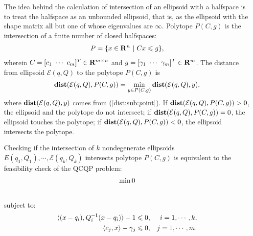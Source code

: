 \documentclass[letterpaper,10pt,english]{sphinxmanual}
\begin{document}
The idea behind the calculation of intersection of an ellipsoid with a
halfspace is to treat the halfspace as an unbounded ellipsoid, that is,
as the ellipsoid with the shape matrix all but one of whose eigenvalues
are $\infty$.
Polytope $P(C,g)$ is the
intersection of a finite number of closed halfspaces:
\label{chap_ellcalc:equation-polytope}\begin{gather}
\begin{split}P = \{x\in{\bf R}^n ~|~ Cx\leqslant g\},\end{split}\label{chap_ellcalc-polytope}
\end{gather}
wherein $C=[c_1 ~ \cdots ~ c_m]^T\in{\bf R}^{m\times n}$ and
$g=[\gamma_1 ~ \cdots ~ \gamma_m]^T\in{\bf R}^m$.
The distance
from ellipsoid ${\mathcal E}(q,Q)$ to the polytope $P(C,g)$
is
\label{chap_ellcalc:equation-dist_poly}\begin{gather}
\begin{split}{\bf dist}({\mathcal E}(q,Q),P(C,g))=\min_{y\in P(C,g)}{\bf dist}({\mathcal E}(q,Q),y),\end{split}\label{chap_ellcalc-dist_poly}
\end{gather}
where ${\bf dist}({\mathcal E}(q,Q),y)$ comes from
({[}dist:sub:\emph{p}oint{]}). If
${\bf dist}({\mathcal E}(q,Q),P(C,g))>0$, the ellipsoid and the
polytope do not intersect; if
${\bf dist}({\mathcal E}(q,Q),P(C,g))=0$, the ellipsoid touches
the polytope; if ${\bf dist}({\mathcal E}(q,Q),P(C,g))<0$, the
ellipsoid intersects the polytope.

Checking if the intersection of $k$ nondegenerate ellipsoids
$E(q_1,Q_1),\cdots,{\mathcal E}(q_k,Q_k)$ intersects polytope
$P(C,g)$ is equivalent to the feasibility check of the QCQP
problem:
\begin{gather}
\begin{split}\min 0\end{split}\notag\\\begin{split}\end{split}\notag
\end{gather}
subject to:
\begin{gather}
\begin{split}\begin{aligned}
\langle (x-q_i),Q_i^{-1}(x-q_i)\rangle - 1 \leqslant0, & & i=1,\cdots,k,\\
\langle c_j, x\rangle - \gamma_j \leqslant0, & & j=1,\cdots,m.\end{aligned}\end{split}\notag
\end{gather}
\end{document}
